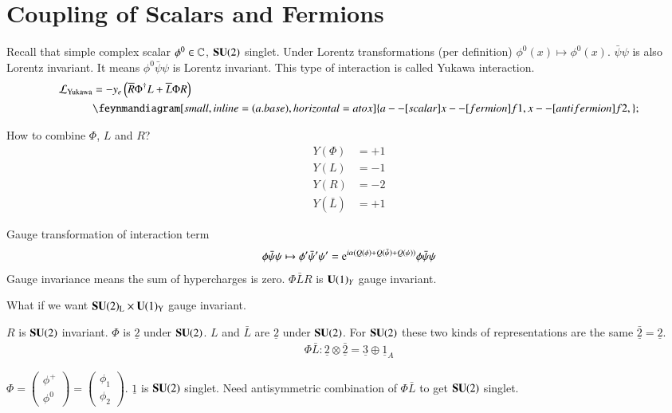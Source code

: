 \section{Coupling of Scalars and Fermions}
Recall that simple complex scalar $\phi^0 \in \mathbb{C}$, $\mathbf{SU}(2)$ singlet. Under Lorentz transformations (per definition) $\phi^0(x) \mapsto \phi^0 (x)$. $\bar\psi \psi$ is also Lorentz invariant. It means $\phi^0\bar\psi \psi$ is Lorentz invariant. This type of interaction is called Yukawa interaction.
\begin{align*}
   \lag_\text{Yukawa} &= - y_e \left( \overline{R} \Phi^\dagger L + \overline{L} \Phi R \right) \\
   &\feynmandiagram[small, inline=(a.base), horizontal=a to x]{ a --[scalar] x --[fermion] f1, x -- [anti fermion] f2,};
\end{align*}

How to combine $\Phi$, $L$ and $R$? 
\begin{align*}
   Y(\Phi) &= +1  \\
   Y(L) &= -1 \\
   Y(R) &= -2 \\
   Y(\bar{L}) &= +1 
\end{align*}

Gauge transformation of interaction term 
\begin{align*}
   \phi \bar\psi \psi \mapsto \phi' \bar\psi' \psi' = \mathrm{e}^{i\alpha(Q(\phi) + Q(\bar\psi) + Q(\psi))} \phi \bar\psi \psi
\end{align*}
Gauge invariance means the sum of hypercharges is zero. $\Phi \bar{L} R$ is $\mathbf{U}(1)_Y$ gauge invariant. 

What if we want $\mathbf{SU}(2)_\text{L} \times \mathbf{U}(1)_\text{Y}$ gauge invariant. 

$R$ is $\mathbf{SU}(2)$ invariant. $\Phi$ is $\underline{2}$ under $\mathbf{SU}(2)$. $L$ and $\bar L$ are $\underline{2}$ under $\mathbf{SU}(2)$. For $\mathbf{SU}(2)$ these two kinds of representations are the same $\bar{\underline{2}} = \underline{2}$.
\begin{align*}
\Phi \bar L: \underline{2} \otimes \bar{\underline{2}} = \underline{3} \oplus \underline{1}_A
\end{align*}

$\Phi = \begin{pmatrix} \phi^+ \\ \phi^0 \end{pmatrix} = \begin{pmatrix} \phi_1 \\ \phi_2 \end{pmatrix}$.
$\underline{1}$ is $\mathbf{SU}(2)$ singlet. Need antisymmetric combination of $\Phi \bar L$ to get $\mathbf{SU}(2)$ singlet.

